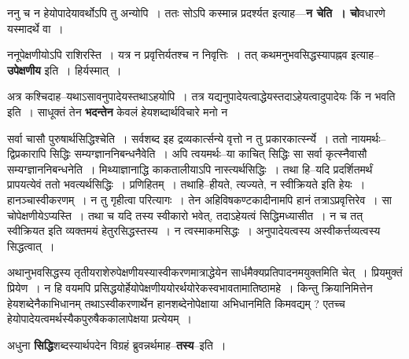 \documentclass[article,12pt,a4paper]{memoir}
\begin{document}
	  \pstart ननु च न हेयोपादेयावर्थोऽपि तु अन्योपि । ततः सोऽपि कस्मान्न प्रदर्श्यत इत्याह—\textbf{न चेति । चो}वधारणे यस्मादर्थे वा ।
	\pend
      

	  \pstart ननूपेक्षणीयोऽपि राशिरस्ति । यत्र न प्रवृत्तिर्यतश्च न निवृत्तिः । तत् कथमनुभवसिद्धस्यापह्नव इत्याह--\textbf{उपेक्षणीय} इति । हिर्यस्मात् ।
	\pend
      

	  \pstart अत्र कश्चिदाह--यथाऽसावनुपादेयस्तथाऽहयोपि । तत्र यद्यनुपादेयत्वाद्धेयस्तदाऽहेयत्वादुपादेयः किं न भवति इति । साधूक्तं तेन \textbf{भदन्तेन} केवलं हेयशब्दार्थविचारे मनो न  \leavevmode{} 
	  
	सर्वा चासौ पुरुषार्थसिद्धिश्चेति । सर्वशब्द इह द्रव्यकार्त्सन्ये वृत्तो न तु प्रकारकार्त्स्न्ये । ततो नायमर्थः--द्विप्रकारापि सिद्धिः सम्यग्ज्ञाननिबन्धनैवेति । अपि त्वयमर्थः--या काचित् सिद्धिः सा सर्वा कृत्स्नैवासौ सम्यग्ज्ञाननिबन्धनेति । मिथ्याज्ञानाद्धि काकतालीयाऽपि नास्त्यर्थसिद्धिः । तथा हि--यदि प्रदर्शितमर्थं प्रापयत्येवं ततो भवत्यर्थसिद्धिः । प्रणिहितम् । तथाहि--हीयते, त्यज्यते, न स्वीक्रियते इति हेयः । हानञ्चास्वीकरणम् । न तु गृहीत्वा परित्यागः । तेन अहिविषकण्टकादीनामपि हानं तत्रा\leavevmode{}ऽप्रवृत्तिरेव । सा चोपेक्षणीयेऽप्यस्ति । तथा च यदि तस्य स्वीकारो भवेत्, तदाऽहेयत्वं सिद्धिमध्यासीत । न च तत् स्वीक्रियत इति व्यक्तमयं हेतुरसिद्धस्तस्य । न त्वस्माकमसिद्धः । अनुपादेयत्वस्य अस्वीकर्त्तव्यत्वस्य सिद्धत्वात् ।
	\pend
      

	  \pstart अथानुभवसिद्धस्य तृतीयराशेरुपेक्षणीयस्यास्वीकरणमात्राद्धेयेन सार्धमैक्यप्रतिपादनमयुक्तमिति चेत् । प्रियमुक्तं प्रियेण । न हि वयमपि प्रसिद्धयोर्हेयोपेक्षणीययोरर्थयोरेकस्वभावतामातिष्ठामहे । किन्तु क्रियानिमित्तेन हेयशब्देनैकाभिधानम् तथाऽस्वीकरणार्थेन हानशब्देनोपेक्षाया अभिधानमिति किमवद्यम् ? एतच्च हेयोपादेयत्वमर्थस्यैकपुरुषैककालापेक्षया प्रत्येयम् ।
	\pend
      

	  \pstart अधुना \textbf{सिद्धि}शब्दस्यार्थपदेन विग्रहं ब्रुवन्नर्थमाह--\textbf{तस्य}--इति ।
	\pend
      
\end{document}
